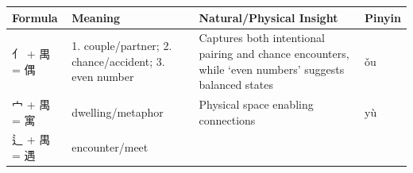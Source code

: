 \begin{longtable}[]{@{}llll@{}}
\toprule
\begin{minipage}[b]{0.15\columnwidth}\raggedright
Formula\strut
\end{minipage} & \begin{minipage}[b]{0.15\columnwidth}\raggedright
Meaning\strut
\end{minipage} & \begin{minipage}[b]{0.43\columnwidth}\raggedright
Natural/Physical Insight\strut
\end{minipage} & \begin{minipage}[b]{0.15\columnwidth}\raggedright
Pinyin\strut
\end{minipage}\tabularnewline
\midrule
\endhead
\begin{minipage}[t]{0.15\columnwidth}\raggedright
亻 + 禺 = 偶\strut
\end{minipage} & \begin{minipage}[t]{0.15\columnwidth}\raggedright
1. couple/partner; 2. chance/accident; 3. even number\strut
\end{minipage} & \begin{minipage}[t]{0.43\columnwidth}\raggedright
Captures both intentional pairing and chance encounters, while `even
numbers' suggests balanced states\strut
\end{minipage} & \begin{minipage}[t]{0.15\columnwidth}\raggedright
ǒu\strut
\end{minipage}\tabularnewline
\begin{minipage}[t]{0.15\columnwidth}\raggedright
宀 + 禺 = 寓\strut
\end{minipage} & \begin{minipage}[t]{0.15\columnwidth}\raggedright
dwelling/metaphor\strut
\end{minipage} & \begin{minipage}[t]{0.43\columnwidth}\raggedright
Physical space enabling connections\strut
\end{minipage} & \begin{minipage}[t]{0.15\columnwidth}\raggedright
yù\strut
\end{minipage}\tabularnewline
\begin{minipage}[t]{0.15\columnwidth}\raggedright
辶 + 禺 = 遇\strut
\end{minipage} & \begin{minipage}[t]{0.15\columnwidth}\raggedright
encounter/meet\strut
\end{minipage} & \begin{minipage}[t]{0.43\columnwidth}\raggedright

\end{minipage}
\end{longtable}
